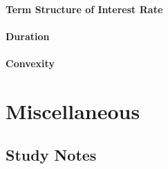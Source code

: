 \documentclass{book}
\begin{document}
\subsection{Term Structure of Interest Rate}
\subsection{Duration}
\subsection{Convexity}

\part{Miscellaneous}
\chapter{Study Notes}
\end{document}
